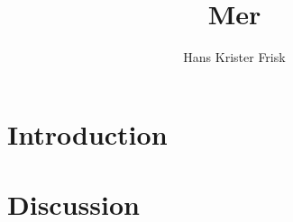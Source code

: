 \documentclass[11pt,a4paper]{article}
\begin{document}
    \title{Mer}
\author{Hans Krister Frisk}
\maketitle

\begin{abstract}

\end{abstract}

\tableofcontents

\section{Introduction}



    \section{Discussion}

\begin{thebibliography}{99}

\end{thebibliography}
\end{document}
